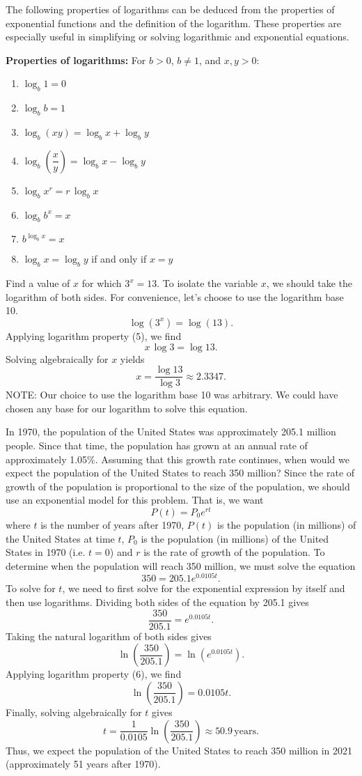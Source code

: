 The following properties of logarithms can be deduced from the properties of exponential functions and the definition of the logarithm.  These properties are especially useful in simplifying or solving logarithmic and exponential equations.
\begin{callout}
    {\bf Properties of logarithms:} For $b>0$, $b \ne 1$, and $x,y>0$:
\begin{enumerate}
\item $\log_{b}1=0$
\item $\log_{b}b=1$
\item $\log_{b}\left(xy\right)=\log_{b}x+\log_{b}y$
\item $\log_{b}\left(\dfrac{x}{y}\right)=\log_{b}x-\log_{b}y$
\item $\log_{b}x^{r}=r\,\log_{b}x$
\item $\log_{b}b^{x}=x$
\item $b^{\log_{b}x}=x$
\item $\log_{b}x=\log_{b}y$ if and only if $x=y$
\end{enumerate}
\end{callout}





\bex
Find a value of $x$ for which $3^{x}=13$.
\eex
To isolate the variable $x$, we should take the logarithm of both sides. For convenience, let's choose to use the logarithm base 10.
	\[
		\log(3^{x})=\log(13).
	\]
Applying logarithm property (5), we find
	\[
		x\,\log3=\log13.
	\]
Solving algebraically for $x$ yields
	\[
		x=\frac{\log13}{\log3}\approx2.3347.
	\]
NOTE: Our choice to use the logarithm base 10 was arbitrary. We could have chosen any base for our logarithm to solve this equation.

\bex
In 1970, the population of the United States was approximately 205.1 million people. Since that time, the population has grown at an annual rate of approximately 1.05\%. Assuming that this growth rate continues, when would we expect the population of the United States to reach 350 million?
\eex
Since the rate of growth of the population is proportional to the size of the population, we should use an exponential model for this problem. That is, we want
	\[
		P(t)=P_{0}e^{rt}
	\]
where $t$ is the number of years after 1970, $P(t)$ is the population (in millions) of the United States at time $t$, $P_{0}$ is the population (in millions) of the United States in 1970 (i.e. $t=0$) and $r$ is the rate of growth of the population. To determine when the population will reach 350 million, we must solve the equation 
	\[
		350=205.1e^{0.0105t}.
	\]
To solve for $t$, we need to first solve for the exponential expression by itself and then use logarithms. Dividing both sides of the equation by 205.1 gives
	\[
		\frac{350}{205.1}=e^{0.0105t}.
	\]
Taking the natural logarithm of both sides gives
	\[
		\ln\left(\frac{350}{205.1}\right)=\ln\left(e^{0.0105t}\right).
	\]
Applying logarithm property (6), we find
	\[
		\ln\left(\frac{350}{205.1}\right)=0.0105t.
	\]
Finally, solving algebraically for $t$ gives
	\[
		t=\frac{1}{0.0105}\ln\left(\frac{350}{205.1}\right)\approx50.9\,\mbox{years}.
	\]
Thus, we expect the population of the United States to reach 350 million in 2021 (approximately 51 years after 1970).
\afterex

